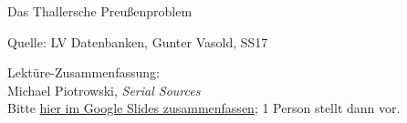 \begin{frame}[allowframebreaks]{Das Thallersche Preußenproblem}
{\scriptsize\flushright Quelle: LV Datenbanken, Gunter Vasold, SS17

}

\end{frame}



\begin{frame}[standout]
    \alert{Lektüre}-Zusammenfassung: \\
    Michael Piotrowski, \emph{Serial Sources} \\[1em]
    {\footnotesize Bitte \alert{\href{https://docs.google.com/presentation/d/1JweC-x1MxLjoKcDcHDtsw6NoYZfSbQ0USVYzYxqVx_c/edit?usp=sharing}{hier im Google Slides zusammenfassen}}; 1 Person stellt dann vor. \\
    }
\end{frame}


